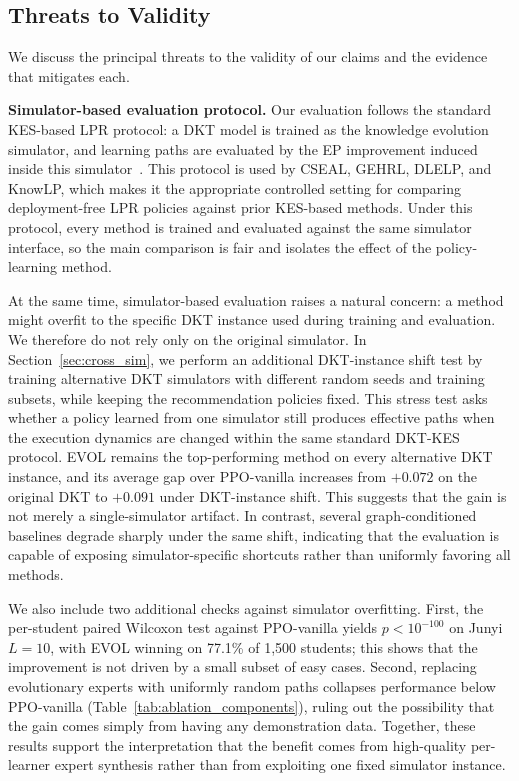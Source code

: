 \documentclass[sigconf,anonymous]{acmart}
\newcommand{\ours}{\textrm{EVOL}}
\begin{document}
\subsection{Threats to Validity}
\label{sec:threats}

We discuss the principal threats to the validity of our claims and the evidence that mitigates each.

\textbf{Simulator-based evaluation protocol.}
Our evaluation follows the standard KES-based LPR protocol: a DKT model is trained as the knowledge evolution simulator, and learning paths are evaluated by the EP improvement induced inside this simulator~\cite{liu2019cseal,li2023gehrl,cheng2025knowlp}. This protocol is used by CSEAL, GEHRL, DLELP, and KnowLP, which makes it the appropriate controlled setting for comparing deployment-free LPR policies against prior KES-based methods. Under this protocol, every method is trained and evaluated against the same simulator interface, so the main comparison is fair and isolates the effect of the policy-learning method.

At the same time, simulator-based evaluation raises a natural concern: a method might overfit to the specific DKT instance used during training and evaluation. We therefore do not rely only on the original simulator. In Section~\ref{sec:cross_sim}, we perform an additional DKT-instance shift test by training alternative DKT simulators with different random seeds and training subsets, while keeping the recommendation policies fixed. This stress test asks whether a policy learned from one simulator still produces effective paths when the execution dynamics are changed within the same standard DKT-KES protocol. \ours{} remains the top-performing method on every alternative DKT instance, and its average gap over PPO-vanilla increases from $+0.072$ on the original DKT to $+0.091$ under DKT-instance shift. This suggests that the gain is not merely a single-simulator artifact. In contrast, several graph-conditioned baselines degrade sharply under the same shift, indicating that the evaluation is capable of exposing simulator-specific shortcuts rather than uniformly favoring all methods.

We also include two additional checks against simulator overfitting. First, the per-student paired Wilcoxon test against PPO-vanilla yields $p\!<\!10^{-100}$ on Junyi $L\!=\!10$, with \ours{} winning on 77.1\% of 1{,}500 students; this shows that the improvement is not driven by a small subset of easy cases. Second, replacing evolutionary experts with uniformly random paths collapses performance below PPO-vanilla (Table~\ref{tab:ablation_components}), ruling out the possibility that the gain comes simply from having any demonstration data. Together, these results support the interpretation that the benefit comes from high-quality per-learner expert synthesis rather than from exploiting one fixed simulator instance.
\end{document}

